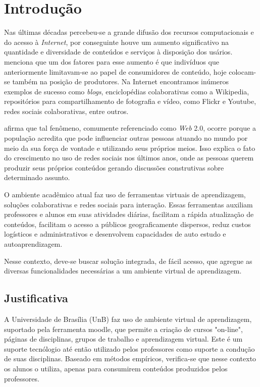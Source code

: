 \chapter{Introdução}
\label{cap-introducao}

Nas últimas décadas percebeu-se a grande difusão dos recursos computacionais e do acesso à \textit{Internet}, por conseguinte houve um aumento significativo na quantidade e diversidade de conteúdos e serviços à disposição dos usários.  menciona que um dos fatores para esse aumento é que indivíduos que anteriormente limitavam-se ao papel de consumidores de conteúdo, hoje colocam-se também na posição de produtores. Na Internet encontramos inúmeros exemplos de sucesso como \textit{blogs}, enciclopédias colaborativas como a Wikipedia, repositórios para compartilhamento de fotografia e vídeo, como Flickr e Youtube, redes sociais colaborativas, entre outros.

\cite{castells2007era} afirma que tal fenômeno, comumente referenciado como \textit{Web} 2.0, ocorre porque a população acredita que pode influenciar outras pessoas atuando no mundo por meio da sua força de vontade e utilizando seus próprios meios. Isso explica o fato do crescimento no uso de redes sociais nos últimos anos, onde as pessoas querem produzir seus próprios conteúdos gerando discussões construtivas sobre determinado assunto.


O ambiente acadêmico atual faz uso de ferramentas virtuais de aprendizagem, soluções colaborativas e redes sociais para interação. Essas ferramentas auxiliam professores e alunos em suas atividades diárias, facilitam a rápida atualização de conteúdos, facilitam o acesso a públicos geograficamente dispersos, reduz custos logísticos e administrativos e desenvolvem capacidades de auto estudo e autoaprendizagem.

Nesse contexto, deve-se buscar solução integrada, de fácil acesso, que agregue  as diversas funcionalidades necessárias a um ambiente virtual de aprendizagem.

\section{Justificativa}

A Universidade de Brasília (UnB) faz uso de ambiente virtual de aprendizagem, suportado pela ferramenta moodle, que permite a criação de cursos "on-line", páginas de disciplinas, grupos de trabalho e aprendizagem virtual. Este é um suporte tecnólogio até então utilizado pelos professores como suporte a condução de suas disciplinas. Baseado em métodos empíricos, verifica-se que nesse contexto os alunos o utiliza, apenas para consumirem conteúdos produzidos pelos professores.

